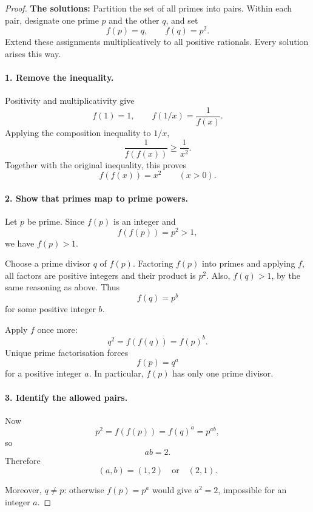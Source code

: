 
\begin{dlsummary}[title={\bfseries Solution 49. The Prime-Pairing Machine},breakable]

\begin{proof}
\textbf{The solutions:} Partition the set of all primes into pairs. Within each pair, designate one prime \(p\) and the other \(q\), and set
\[
\boxed{f(p)=q,\qquad f(q)=p^2.}
\]
Extend these assignments multiplicatively to all positive rationals. Every solution arises this way.

\paragraph{1. Remove the inequality.}

Positivity and multiplicativity give
\[
f(1)=1,\qquad f(1/x)=\frac1{f(x)}.
\]
Applying the composition inequality to \(1/x\),
\[
\frac1{f(f(x))}\ge\frac1{x^2}.
\]
Together with the original inequality, this proves
\[
\boxed{f(f(x))=x^2\qquad(x>0).} \tag{1}
\]

\paragraph{2. Show that primes map to prime powers.}

Let \(p\) be prime. Since \(f(p)\) is an integer and
\[
f(f(p))=p^2>1,
\]
we have \(f(p)>1\).

Choose a prime divisor \(q\) of \(f(p)\). Factoring \(f(p)\) into primes and applying \(f\), all factors are positive integers and their product is \(p^2\). Also, \(f(q)>1\), by the same reasoning as above. Thus
\[
f(q)=p^b
\]
for some positive integer \(b\).

Apply \(f\) once more:
\[
q^2=f(f(q))=f(p)^b.
\]
Unique prime factorisation forces
\[
\boxed{f(p)=q^a}
\]
for a positive integer \(a\). In particular, \(f(p)\) has only one prime divisor.

\paragraph{3. Identify the allowed pairs.}

Now
\[
p^2=f(f(p))=f(q)^a=p^{ab},
\]
so
\[
ab=2.
\]
Therefore
\[
(a,b)=(1,2)\quad\text{or}\quad(2,1).
\]

Moreover, \(q\ne p\): otherwise \(f(p)=p^a\) would give \(a^2=2\), impossible for an integer \(a\).


\end{proof}
\end{dlsummary}
